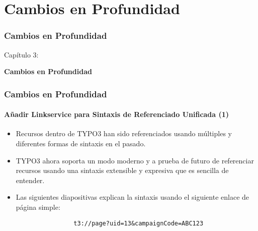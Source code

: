 %

\section{Cambios en Profundidad}
\begin{frame}[fragile]
	\frametitle{Cambios en Profundidad}

	\begin{center}\huge{Capítulo 3:}\end{center}
	\begin{center}\huge{\color{typo3darkgrey}\textbf{Cambios en Profundidad}}\end{center}

\end{frame}

\begin{frame}[fragile]
	\frametitle{Cambios en Profundidad}
	\framesubtitle{Añadir Linkservice para Sintaxis de Referenciado Unificada (1)}

	\begin{itemize}

		\item Recursos dentro de TYPO3 han sido referenciados usando múltiples y diferentes formas de sintaxis en el pasado.

		\item TYPO3 ahora soporta un modo moderno y a prueba de futuro de referenciar recursos usando una sintaxis
			extensible y expresiva que es sencilla de entender.

		\item Las siguientes diapositivas explican la sintaxis usando el siguiente enlace de página simple:

			\begin{lstlisting}
				t3://page?uid=13&campaignCode=ABC123
			\end{lstlisting}

	\end{itemize}

\end{frame}

